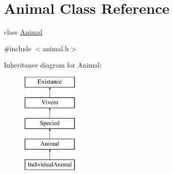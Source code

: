 \hypertarget{classAnimal}{
\section{Animal Class Reference}
\label{classAnimal}
}


class \hyperlink{classAnimal}{Animal}  




{\ttfamily \#include $<$animal.h$>$}

Inheritance diagram for Animal:\begin{figure}[H]
\begin{center}
\leavevmode
\includegraphics[height=5.000000cm]{classAnimal}
\end{center}
\end{figure}
